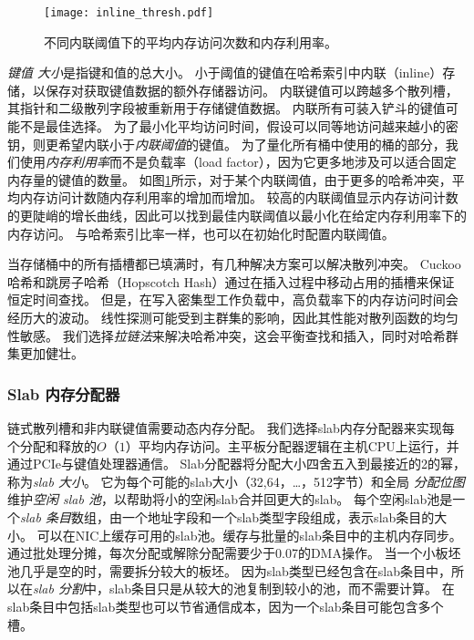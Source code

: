 \begin{figure}[t]
\centering
\texttt{[image: inline\_thresh.pdf]}
\caption{不同内联阈值下的平均内存访问次数和内存利用率。}
\label{kvdirect:fig:inline-offline}

\end{figure}

\textit {键值 大小}是指键和值的总大小。
小于阈值的键值在哈希索引中内联（inline）存储，以保存对获取键值数据的额外存储器访问。
内联键值可以跨越多个散列槽，其指针和二级散列字段被重新用于存储键值数据。
内联所有可装入铲斗的键值可能不是最佳选择。
为了最小化平均访问时间，假设可以同等地访问越来越小的密钥，则更希望内联小于\textit {内联阈值}的键值。
为了量化所有桶中使用的桶的部分，我们使用\textit {内存利用率}而不是负载率（load factor），因为它更多地涉及可以适合固定内存量的键值的数量。
如图\ref {kvdirect:fig:inline-offline}所示，对于某个内联阈值，由于更多的哈希冲突，平均内存访问计数随内存利用率的增加而增加。
较高的内联阈值显示内存访问计数的更陡峭的增长曲线，因此可以找到最佳内联阈值以最小化在给定内存利用率下的内存访问。
与哈希索引比率一样，也可以在初始化时配置内联阈值。

当存储桶中的所有插槽都已填满时，有几种解决方案可以解决散列冲突。
Cuckoo哈希\cite {pagh2004cuckoo}和跳房子哈希（Hopscotch Hash）\cite {herlihy2008hopscotch}通过在插入过程中移动占用的插槽来保证恒定时间查找。
但是，在写入密集型工作负载中，高负载率下的内存访问时间会经历大的波动。
线性探测可能受到主群集的影响，因此其性能对散列函数的均匀性敏感。
我们选择\textit {拉链法}来解决哈希冲突，这会平衡查找和插入，同时对哈希群集更加健壮。


\subsubsection{Slab 内存分配器}
\label{kvdirect:sec:slab}

链式散列槽和非内联键值需要动态内存分配。
我们选择slab内存分配器\cite {bonwick1994slab}来实现每个分配和释放的$O（1）$平均内存访问。主平板分配器逻辑在主机CPU上运行，并通过PCIe与键值处理器通信。
Slab分配器将分配大小四舍五入到最接近的2的幂，称为\textit {slab 大小}。
它为每个可能的slab大小（32,64，\ldots，512字节）和全局 \textit {分配位图}维护\textit {空闲 slab 池}，以帮助将小的空闲slab合并回更大的slab。
每个空闲slab池是一个\textit {slab 条目}数组，由一个地址字段和一个slab类型字段组成，表示slab条目的大小。
可以在NIC上缓存可用的slab池。缓存与批量的slab条目中的主机内存同步。通过批处理分摊，每次分配或解除分配需要少于0.07的DMA操作。
当一个小板坯池几乎是空的时，需要拆分较大的板坯。
因为slab类型已经包含在slab条目中，所以在\textit {slab 分割}中，slab条目只是从较大的池复制到较小的池，而不需要计算。
在slab条目中包括slab类型也可以节省通信成本，因为一个slab条目可能包含多个槽。

